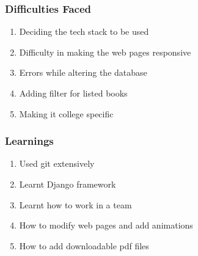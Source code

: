 \documentclass[14pt]{beamer}
\begin{document}
\begin{frame}
    \frametitle{Difficulties Faced}
    \begin{enumerate}
        \item<1-> Deciding the tech stack to be used
        \item<2-> Difficulty in making the web pages responsive
        \item<3-> Errors while altering the database
        \item<4-> Adding filter for listed books
        \item<5-> Making it college specific
    \end{enumerate}
\end{frame}

\begin{frame}
    \frametitle{Learnings}
    \begin{enumerate}
        \item<1-> Used git extensively
        \item<2-> Learnt Django framework
        \item<3-> Learnt how to work in a team
        \item<4-> How to modify web pages and add animations
        \item<5-> How to add downloadable pdf files
    \end{enumerate}
\end{frame}
\end{document}
